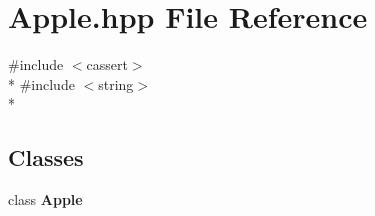 \section{Apple.\-hpp File Reference}
\label{_apple_8hpp}
{\ttfamily \#include $<$cassert$>$}\\*
{\ttfamily \#include $<$string$>$}\\*
\subsection*{Classes}
\begin{DoxyCompactItemize}
\item 
class {\bf Apple}
\end{DoxyCompactItemize}
